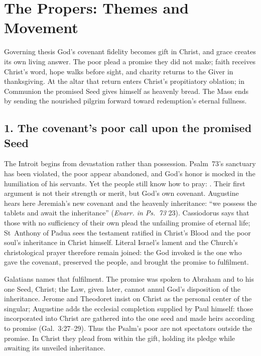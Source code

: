\section*{The Propers: Themes and Movement}
\label{triptych:brief-synthesis:start}
\begingroup\footnotesize
\setlength{\parskip}{0.32em}

\begin{studybox}{Governing thesis}
God's covenant fidelity becomes gift in Christ, and grace creates its own
living answer. The poor plead a promise they did not make; faith receives
Christ's word, hope walks before sight, and charity returns to the Giver in
thanksgiving. At the altar that return enters Christ's propitiatory oblation;
in Communion the promised Seed gives himself as heavenly bread. The Mass ends
by sending the nourished pilgrim forward toward redemption's eternal fullness.
\end{studybox}

\subsection*{1. The covenant's poor call upon the promised Seed\enspace{}}

The Introit begins from devastation rather than possession. Psalm~73's
sanctuary has been violated, the poor appear abandoned, and God's honor is
mocked in the humiliation of his servants. Yet the people still know how to
pray: . Their first argument is not
their strength or merit, but God's own covenant. Augustine hears here
Jeremiah's new covenant and the heavenly inheritance: ``we possess the tablets
and await the inheritance'' (\emph{Enarr. in Ps.~73} 23). Cassiodorus says that
those with no sufficiency of their own plead the unfailing promise of eternal
life; St~Anthony of Padua sees the testament ratified in Christ's Blood and the
poor soul's inheritance in Christ himself. Literal Israel's lament and the
Church's christological prayer therefore remain joined: the God invoked is the
one who gave the covenant, preserved the people, and brought the promise to
fulfilment.

Galatians names that fulfilment. The promise was spoken to Abraham and to his
one Seed, Christ; the Law, given later, cannot annul God's disposition of the
inheritance. Jerome and Theodoret insist on Christ as the personal center of
the singular; Augustine adds the ecclesial completion supplied by Paul himself:
those incorporated into Christ are gathered into the one seed and made heirs
according to promise (Gal.~3:27--29). Thus the Psalm's poor are not spectators
outside the promise. In Christ they plead from within the gift, holding its
pledge while awaiting its unveiled inheritance.

